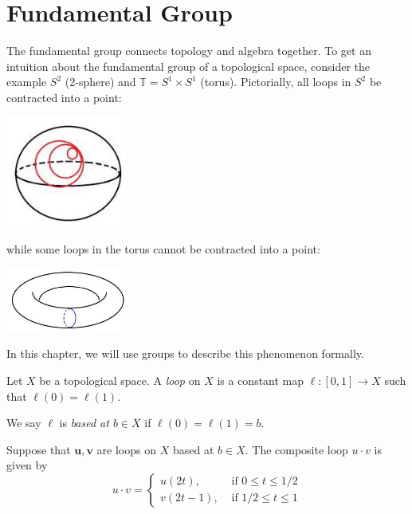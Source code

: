 \chapter{Fundamental Group}
The fundamental group connects topology and algebra together. To get an intuition about the fundamental group of a topological space, consider the example \({S}^{2}\) (2-sphere) and \(\mathbb{T} ={S}^{1} \times  {S}^{1}\) (torus). Pictorially, all loops in $S^2$ be contracted into a point:
\begin{center}
\includegraphics[width=0.3\textwidth]{images/Ch7_S2.jpg}
\end{center}
while some loops in the torus cannot be contracted into a point:
\begin{center}
\includegraphics[width=0.3\textwidth]{images/Ch7_T.jpg}
\end{center}
In this chapter, we will use groups to describe this phenomenon formally.


\begin{definition} [loop] Let \(X\) be a topological space. A \emph{loop} on \(X\) is a constant map \(\ell  : \left\lbrack  {0,1}\right\rbrack   \rightarrow  X\) such that \(\ell \left( 0\right)  = \ell \left( 1\right)\).

We say \(\ell\) is \emph{based at \(b \in  X\)} if \(\ell \left( 0\right)  = \ell \left( 1\right)  = b\).
\end{definition}

\begin{definition}  Suppose that \(\mathbf{u},\mathbf{v}\) are loops on \(X\) based at \(b \in  X\). The composite loop \(u \cdot  v\) is given by
\[
u \cdot  v = \left\{  \begin{array}{rr} u\left( {2t}\right), & \text{ if }0 \leq  t \leq  1/2 \\  v\left( {{2t} - 1}\right), & \text{ if }1/2 \leq  t \leq  1 \end{array}\right.
\]
\end{definition}

